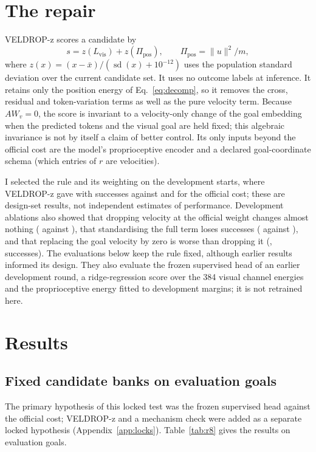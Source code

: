 \section{The repair}
\label{sec:method}
VELDROP-z scores a candidate by
\begin{equation}
s=z(L_{\mathrm{vis}})+z(\Pi_{\mathrm{pos}}),\qquad \Pi_{\mathrm{pos}}=\|u\|^2/m,
\end{equation}
where $z(x)=(x-\bar x)/(\operatorname{sd}(x)+10^{-12})$ uses the population standard deviation over the current
candidate set. It uses no outcome labels at inference. It retains only the position energy of Eq.~\eqref{eq:decomp},
so it removes the cross, residual and token-variation terms as well as the pure velocity term. Because $AW_v=0$, the
score is invariant to a velocity-only change of the goal embedding when the predicted tokens and the visual goal are
held fixed; this algebraic invariance is not by itself a claim of better control. Its only inputs beyond the official
cost are the model's proprioceptive encoder and a declared goal-coordinate schema (which entries of $r$ are
velocities).

I selected the rule and its weighting on the development starts, where VELDROP-z gave \DevVZ{} with \DevVZSucc{}
successes against \DevOff{} and \DevOffSucc{} for the official cost; these are design-set results, not independent estimates of performance.
Development ablations also showed that dropping velocity at the official weight changes almost nothing (\DevVOne{} against \DevOff), that
standardising the full term loses successes (\DevHstdSucc{} against \DevOffSucc), and that replacing the goal velocity
by zero is worse than dropping it (\DevVzero, \DevVzeroSucc{} successes). The evaluations below keep the rule fixed, although earlier results informed its design. They also evaluate the
frozen supervised head of an earlier development round, a ridge-regression score over the 384 visual channel energies
and the proprioceptive energy fitted to development margins; it is not retrained here.

\section{Results}
\label{sec:results}

\subsection{Fixed candidate banks on evaluation goals}
\label{sec:r8}
The primary hypothesis of this locked test was the frozen supervised head against the official cost; VELDROP-z and a
mechanism check were added as a separate locked hypothesis (Appendix~\ref{app:locks}). Table~\ref{tab:r8} gives the
results on \REightN{} evaluation goals.

